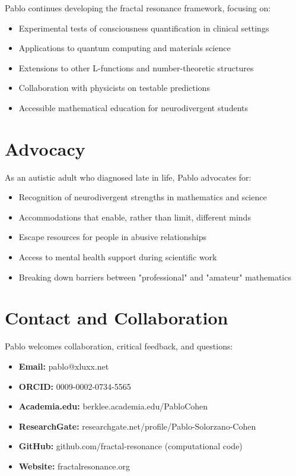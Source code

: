 Pablo continues developing the fractal resonance framework, focusing on:

\begin{itemize}
\item Experimental tests of consciousness quantification in clinical settings
\item Applications to quantum computing and materials science
\item Extensions to other L-functions and number-theoretic structures
\item Collaboration with physicists on testable predictions
\item Accessible mathematical education for neurodivergent students
\end{itemize}

\section*{Advocacy}

As an autistic adult who diagnosed late in life, Pablo advocates for:

\begin{itemize}
\item Recognition of neurodivergent strengths in mathematics and science
\item Accommodations that enable, rather than limit, different minds
\item Escape resources for people in abusive relationships
\item Access to mental health support during scientific work
\item Breaking down barriers between "professional" and "amateur" mathematics
\end{itemize}

\section*{Contact and Collaboration}

Pablo welcomes collaboration, critical feedback, and questions:

\begin{itemize}
\item \textbf{Email:} pablo@xluxx.net
\item \textbf{ORCID:} 0009-0002-0734-5565
\item \textbf{Academia.edu:} berklee.academia.edu/PabloCohen
\item \textbf{ResearchGate:} researchgate.net/profile/Pablo-Solorzano-Cohen
\item \textbf{GitHub:} github.com/fractal-resonance (computational code)
\item \textbf{Website:} fractalresonance.org
\end{itemize}

